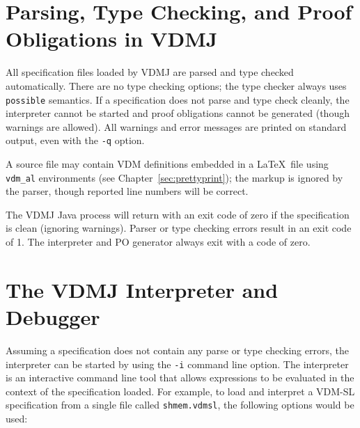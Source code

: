 \documentclass{overturerepchap}
\begin{document}


\section{Parsing, Type Checking, and Proof Obligations in VDMJ}

All specification files loaded by VDMJ are parsed and type checked
automatically. There are no type checking options; the type checker
always uses \texttt{possible} semantics. If a specification does not parse
and type check cleanly, the interpreter cannot be started and proof
obligations cannot be generated (though warnings are allowed). All
warnings and error messages are printed on standard output, even
with the \texttt{-q} option.

A source file may contain VDM definitions embedded
in a \LaTeX\ file using \verb|vdm_al| environments (see
Chapter~\ref{sec:prettyprint}); the markup is ignored by the parser,
though reported line numbers will be correct.

The VDMJ Java process will return with an exit code of zero if the
specification is clean (ignoring warnings). Parser or type checking
errors result in an exit code of 1. The interpreter and PO generator
always exit with a code of zero.

\section{The VDMJ Interpreter and Debugger}

Assuming a specification does not contain any parse or type checking errors, the interpreter can be
started by using the \texttt{-i} command line option.
The interpreter is an interactive command line tool that allows expressions to be evaluated in the
context of the specification loaded. For example, to load and interpret a
VDM-SL specification from a single file called \texttt{shmem.vdmsl},
the following options would be used:
\end{document}
